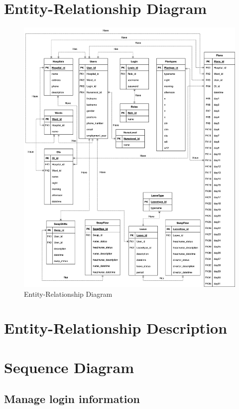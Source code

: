 \section{Entity-Relationship Diagram}
\begin{figure}[h]
    \centering
    \includegraphics[width=1\textwidth]{ER Diagram.png}
    \caption{Entity-Relationship Diagram}
    \end{figure}



    \section{Entity-Relationship Description}





\section{Sequence Diagram}

\subsection{Manage login information}

